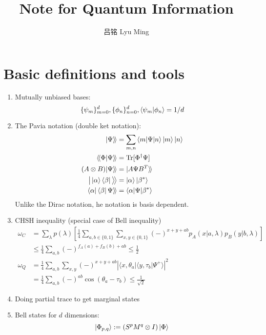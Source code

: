 \documentclass[11pt,a4paper]{article}%
\numberwithin{equation}{section}
\newcommand\kk{\rangle\!\rangle}
\newcommand\bb{\langle\!\langle}
\newcommand{\Tr}{\operatorname{Tr}}
\begin{document}
\title{Note for Quantum Information}
\author{吕铭 Lyu Ming}
\maketitle
\section{Basic definitions and tools} %
\label{sec:basic_definitions_and_tools}
\begin{enumerate}
    \item Mutually unbiased bases:
    \begin{equation}
     \{\psi_m\}_{m=0}^d,\{\phi_n\}_{n=0}^d,\braket{\psi_m|\phi_n} = 1/d
    \end{equation}
    \item The Pavia notation (double ket notation):
    \begin{align}
        |\Psi\kk &= \sum_{m,n} \braket{m|\Psi|n}\ket{m}\ket{n} \\
        \bb\Phi|\Psi\kk &=\Tr [\Phi^\dagger\Psi]\\
        (A\otimes B)|\Psi\kk &= |A\Psi B^T\kk \\
        \big|\ket \alpha \bra \beta\big\rangle\!\big\rangle &= \ket\alpha\ket{\beta^*}\\
        \bra\alpha\bra\beta\Psi\kk &= \braket{\alpha|\Psi|\beta^*}
    \end{align}
    Unlike the Dirac notation, he notation is basis dependent.
    \item CHSH inequality (special case of Bell inequality)
    \begin{align}
        \omega_C &= \sum_\lambda p(\lambda)\left[\frac 14 \sum_{a,b\in\{0,1\}}\sum_{x,y\in\{0,1\}} (-)^{x+y+ab}p_A(x|a,\lambda)p_B(y|b,\lambda)\right] \\
        &\le \frac 14\sum_{a,b}(-)^{f_A(a)+f_B(b)+ab} \le \frac 12 \\
        \omega_Q &= \frac 14 \sum_{a,b}\sum_{x,y}(-)^{x+y+ab}\left|\langle x,\theta_a|\langle y,\tau_b|\Psi^+\rangle \right|^2 \\
        &= \frac 14\sum_{a,b}(-)^{ab}\cos (\theta_a - \tau_b)\le \frac 1{\sqrt 2}
    \end{align}
    \item Doing partial trace to get marginal states
    \item Bell states for $d$ dimensions: 
    \begin{equation}
        \ket{\Phi_{p,q}} := (S^pM^q\otimes I)\ket\Phi

\end{equation}
\end{enumerate}
\end{document}
